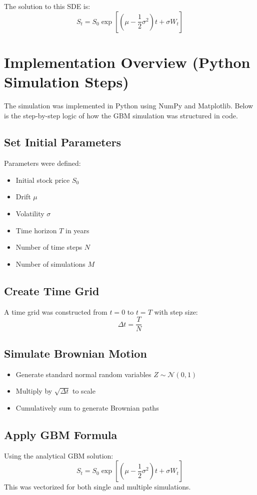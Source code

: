 \documentclass[12pt]{article}
\begin{document}
The solution to this SDE is:
\[
S_t = S_0 \exp\left[\left(\mu - \frac{1}{2} \sigma^2\right)t + \sigma W_t\right]
\]

\section{Implementation Overview (Python Simulation Steps)}

The simulation was implemented in Python using NumPy and Matplotlib. Below is the step-by-step logic of how the GBM simulation was structured in code.

\subsection{Set Initial Parameters}
Parameters were defined:
\begin{itemize}
    \item Initial stock price \( S_0 \)
    \item Drift \( \mu \)
    \item Volatility \( \sigma \)
    \item Time horizon \( T \) in years
    \item Number of time steps \( N \)
    \item Number of simulations \( M \)
\end{itemize}

\subsection{Create Time Grid}
A time grid was constructed from \( t = 0 \) to \( t = T \) with step size:
\[
\Delta t = \frac{T}{N}
\]

\subsection{Simulate Brownian Motion}
\begin{itemize}
    \item Generate standard normal random variables \( Z \sim \mathcal{N}(0,1) \)
    \item Multiply by \( \sqrt{\Delta t} \) to scale
    \item Cumulatively sum to generate Brownian paths
\end{itemize}

\subsection{Apply GBM Formula}
Using the analytical GBM solution:
\[
S_t = S_0 \exp\left[\left(\mu - \frac{1}{2} \sigma^2\right)t + \sigma W_t\right]
\]
This was vectorized for both single and multiple simulations.
\end{document}
